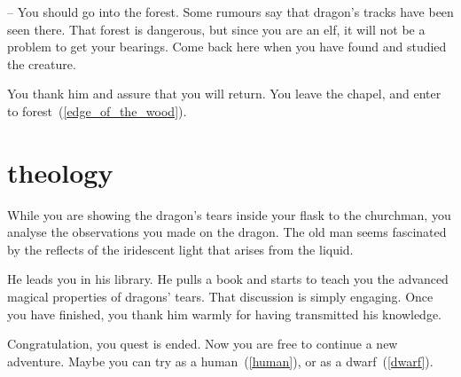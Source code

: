 -- You should go into the forest. Some rumours say that dragon's tracks have
been seen there. That forest is dangerous, but since you are an elf, it will not
be a problem to get your bearings. Come back here when you have found and
studied the creature.

You thank him and assure that you will return. You leave the chapel, and enter
to forest~(\ref{edge_of_the_wood}).

\section{theology}

While you are showing the dragon's tears inside your flask to the churchman, you
analyse the observations you made on the dragon. The old man seems fascinated by
the reflects of the iridescent light that arises from the liquid.

He leads you in his library. He pulls a book and starts to teach you the advanced
magical properties of dragons' tears. That discussion is simply engaging.
Once you have finished, you thank him warmly for having transmitted his
knowledge.

Congratulation, you quest is ended. Now you are free to continue a new
adventure. Maybe you can try as a human~(\ref{human}), or as a
dwarf~(\ref{dwarf}).
